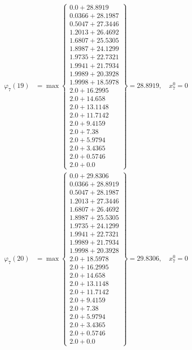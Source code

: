 \documentclass{article}
\begin{document}
\begin{align*}
  
  
  
\varphi_{7}(19) &= \max \left\{ \begin{array}{c}
0.0 + 28.8919 \\
 0.0366 + 28.1987 \\
 0.5047 + 27.3446 \\
 1.2013 + 26.4692 \\
 1.6807 + 25.5305 \\
 1.8987 + 24.1299 \\
 1.9735 + 22.7321 \\
 1.9941 + 21.7934 \\
 1.9989 + 20.3928 \\
 1.9998 + 18.5978 \\
 2.0 + 16.2995 \\
 2.0 + 14.658 \\
 2.0 + 13.1148 \\
 2.0 + 11.7142 \\
 2.0 + 9.4159 \\
 2.0 + 7.38 \\
 2.0 + 5.9794 \\
 2.0 + 3.4365 \\
 2.0 + 0.5746 \\
 2.0 + 0.0
\end{array} \right\}=28.8919,\quad x_{7}^0=0\\
  
  
  
  
\varphi_{7}(20) &= \max \left\{ \begin{array}{c}
0.0 + 29.8306 \\
 0.0366 + 28.8919 \\
 0.5047 + 28.1987 \\
 1.2013 + 27.3446 \\
 1.6807 + 26.4692 \\
 1.8987 + 25.5305 \\
 1.9735 + 24.1299 \\
 1.9941 + 22.7321 \\
 1.9989 + 21.7934 \\
 1.9998 + 20.3928 \\
 2.0 + 18.5978 \\
 2.0 + 16.2995 \\
 2.0 + 14.658 \\
 2.0 + 13.1148 \\
 2.0 + 11.7142 \\
 2.0 + 9.4159 \\
 2.0 + 7.38 \\
 2.0 + 5.9794 \\
 2.0 + 3.4365 \\
 2.0 + 0.5746 \\
 2.0 + 0.0
\end{array} \right\}=29.8306,\quad x_{7}^0=0\\
  

\end{align*}
\end{document}
